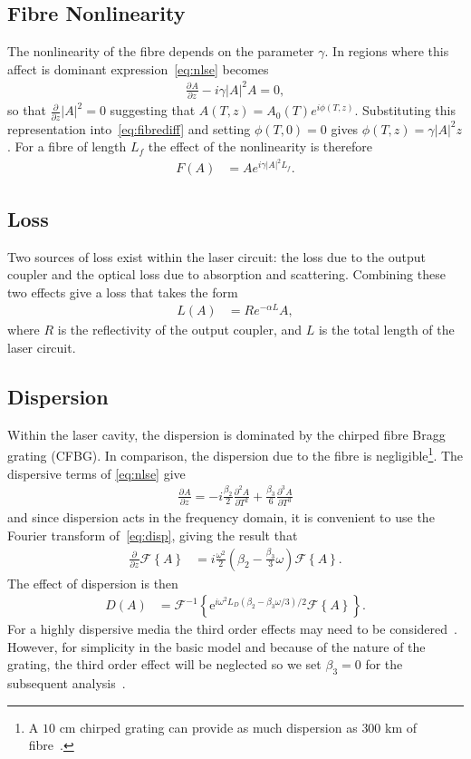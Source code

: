 \documentclass[%
 aps,
 jmp,%
 amsmath,amssymb,
 reprint,%
nofootinbib
]{revtex4-1}
\newcommand{\pdiff}[3][]{\frac{\partial^{#1}#2}{\partial{#3}^{#1}}}
\newcommand{\FT}[1]{\mathcal{F}\left\{ #1 \right\}}
\newcommand{\FTi}[1]{\mathcal{F}^{-1}\left\{ #1 \right\}}
\begin{document}
\subsection{Fibre Nonlinearity}
The nonlinearity of the fibre depends on the parameter $\gamma$. In regions where this affect is dominant expression~\eqref{eq:nlse} becomes
\begin{align}
\label{eq:fibrediff}
	\pdiff{A}{z} - i \gamma |A|^2 A = 0,
\end{align}
so that $\frac{\partial}{\partial z} |A|^2 = 0$ suggesting that $A(T,z) = A_0(T) e^{i \phi(T,z)}$. Substituting this representation into~\eqref{eq:fibrediff} and setting $\phi(T,0)=0$ gives $\phi(T,z) = \gamma |A|^2 z$. For a fibre of length $L_f$ the effect of the nonlinearity is therefore
\begin{align}
\label{eq:fibre}
	F(A) &= A e^{i \gamma |A|^2 L_f}.
\end{align}

\subsection{Loss}
Two sources of loss exist within the laser circuit: the loss due to the output coupler and the optical loss due to absorption and scattering. Combining these two effects give a loss that takes the form
\begin{align}
\label{eq:fibreloss}
	L(A) &= R e^{- \alpha L}A,
\end{align}
where $R$ is the reflectivity of the output coupler, and $L$ is the total length of the laser circuit.

\subsection{Dispersion}
Within the laser cavity, the dispersion is dominated by the chirped fibre Bragg grating (CFBG). In comparison, the dispersion due to the fibre is negligible\footnote{A $10$ cm chirped grating can provide as much dispersion as $300$ km of fibre~\cite{agrawal2002}.}. The dispersive terms of \eqref{eq:nlse} give
\begin{align}
\label{eq:disp}
	\pdiff{A}{z} = -i \frac{\beta_2}{2} \pdiff[2]{A}{T} + \frac{\beta_3}{6} \pdiff[3]{A}{T}
\end{align}
and since dispersion acts in the frequency domain, it is convenient to use the Fourier transform of~\eqref{eq:disp}, giving the result that
\begin{align*}
	\pdiff{}{z}\FT{A} &= i\frac{\omega^2}{2}\left(\beta_2 - \frac{\beta_3}{3} \omega\right) \FT{A}.
\end{align*}
The effect of dispersion is then
\begin{align}
\label{eq:dispersion}
	D(A) &= \FTi{\textrm{e}^{i \omega^2 L_D(\beta_2 - \beta_3 \omega/3)/2} \FT{A}}.
\end{align}
For a highly dispersive media the third order effects may need to be considered~\cite{agrawal2013, litchinitser}. However, for simplicity in the basic model and because of the nature of the grating, the third order effect will be neglected so we set $\beta_3=0$ for the subsequent analysis~\cite{agrawal2013, ferreira}.
\end{document}
